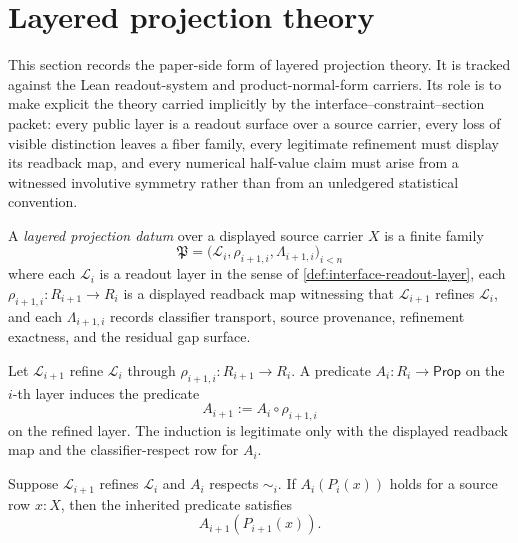 \section{Layered projection theory}
\label{sec:layered-projection-theory}

\begin{remark}
\label{rem:layered-projection-theory-status}
This section records the paper-side form of layered projection theory.
It is tracked against the Lean readout-system and product-normal-form
carriers. Its role is to make explicit the theory carried implicitly by the
interface--constraint--section packet: every public layer is a readout surface
over a source carrier, every loss of visible distinction leaves a fiber
family, every legitimate refinement must display its readback map, and every
numerical half-value claim must arise from a witnessed involutive symmetry
rather than from an unledgered statistical convention.
\end{remark}

\begin{definition}
\label{def:layered-projection-datum}
A \emph{layered projection datum} over a displayed source carrier $X$ is
a finite family
$$
\mathfrak P=
\bigl(\mathcal L_i,\rho_{i+1,i},\Lambda_{i+1,i}\bigr)_{i<n}
$$
where each $\mathcal L_i$ is a readout layer in the sense of
\autoref{def:interface-readout-layer}, each
$\rho_{i+1,i}:R_{i+1}\to R_i$ is a displayed readback map witnessing that
$\mathcal L_{i+1}$ refines $\mathcal L_i$, and each
$\Lambda_{i+1,i}$ records classifier transport, source provenance,
refinement exactness, and the residual gap surface.
\end{definition}

\begin{definition}
\label{def:layered-projection-inherited-predicate}
Let $\mathcal L_{i+1}$ refine $\mathcal L_i$ through
$\rho_{i+1,i}:R_{i+1}\to R_i$. A predicate
$A_i:R_i\to\mathsf{Prop}$ on the $i$-th layer induces the predicate
$$
A_{i+1}:=A_i\circ\rho_{i+1,i}
$$
on the refined layer. The induction is legitimate only with the displayed
readback map and the classifier-respect row for $A_i$.
\end{definition}

\begin{theorem}
\label{thm:layered-projection-predicate-inheritance}
Suppose $\mathcal L_{i+1}$ refines $\mathcal L_i$ and $A_i$ respects
$\sim_i$. If $A_i(P_i(x))$ holds for a source row $x:X$, then the
inherited predicate satisfies
$$
A_{i+1}(P_{i+1}(x)).
$$
\end{theorem}

